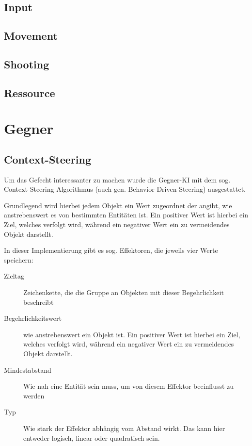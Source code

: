 \documentclass[a4paper,10pt,ngerman,fontsize=12pt]{scrreprt}
\begin{document}
\lipsum[3]



\subsection{Input}

\lipsum[3]


\subsection{Movement}

\lipsum[3]


\subsection{Shooting}

\lipsum[3]


\subsection{Ressource}

\lipsum[3]




\section{Gegner}

\lipsum[3]



\subsection{Context-Steering}

Um das Gefecht interessanter zu machen wurde die Gegner-KI mit dem sog. Context-Steering Algorithmus\cite{qCtxSteer} (auch gen. Behavior-Driven Steering) ausgestattet.

Grundlegend wird hierbei jedem Objekt ein Wert zugeordnet der angibt, wie anstrebenswert es von bestimmten Entitäten ist. Ein positiver Wert ist hierbei ein Ziel, welches verfolgt wird, während ein negativer Wert ein zu vermeidendes Objekt darstellt.

In dieser Implementierung gibt es sog. Effektoren, die jeweils vier Werte speichern:

\begin{description}
\item[Zieltag] Zeichenkette, die die Gruppe an Objekten mit dieser Begehrlichkeit beschreibt
\item[Begehrlichkeitswert] wie anstrebenswert ein Objekt ist. Ein positiver Wert ist hierbei ein Ziel, welches verfolgt wird, während ein negativer Wert ein zu vermeidendes Objekt darstellt.
\item[Mindestabstand] Wie nah eine Entität sein muss, um von diesem Effektor beeinflusst zu werden
\item[Typ] Wie stark der Effektor abhängig vom Abstand wirkt. Das kann hier entweder logisch, linear oder quadratisch sein. 
\end{description}
\end{document}
